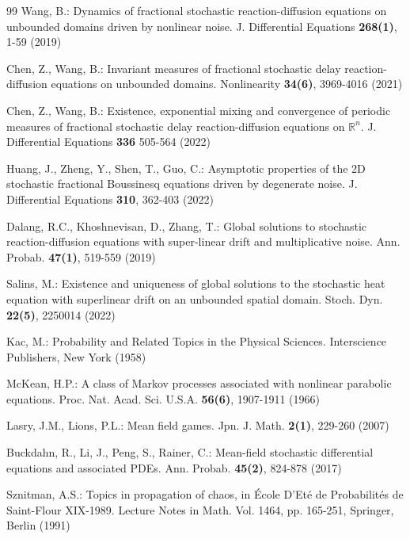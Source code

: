 \documentclass[11pt]{article}
\numberwithin{equation}{section}
\theoremstyle{plain}
\begin{document}
\begin{thebibliography}{99}
  Wang, B.:
  Dynamics of fractional stochastic reaction-diffusion equations on unbounded domains driven by nonlinear noise.
  J. Differential Equations  {\bf 268(1)}, 1-59 (2019)

  Chen, Z.,  Wang, B.:
  Invariant measures of fractional stochastic delay reaction-diffusion equations on unbounded domains.
  Nonlinearity  {\bf 34(6)}, 3969-4016 (2021)

  Chen, Z.,  Wang, B.:
  Existence, exponential mixing and convergence of periodic measures of fractional stochastic delay reaction-diffusion equations on $\mathbb{R}^n$.
  J. Differential Equations  {\bf 336} 505-564 (2022)

  Huang, J.,  Zheng, Y.,  Shen, T.,  Guo, C.:
  Asymptotic properties of the 2D stochastic fractional Boussinesq equations driven by degenerate noise.
  J. Differential Equations {\bf 310}, 362-403 (2022)

  Dalang, R.C.,  Khoshnevisan, D.,  Zhang, T.:
  Global solutions to stochastic reaction-diffusion equations with super-linear drift and multiplicative noise.
  Ann. Probab. {\bf 47(1)}, 519-559 (2019)

  Salins, M.:
  Existence and uniqueness of global solutions to the stochastic heat equation with superlinear drift on an unbounded spatial domain.
  Stoch. Dyn. {\bf 22(5)}, 2250014 (2022)




   Kac, M.:
   Probability and Related Topics in the Physical Sciences.
   Interscience Publishers, New York (1958)

   McKean, H.P.:
   A class of Markov processes associated with nonlinear parabolic equations.
   Proc. Nat. Acad. Sci. U.S.A. {\bf 56(6)}, 1907-1911 (1966)

   Lasry, J.M.,  Lions, P.L.:
   Mean field games.
   Jpn. J. Math. {\bf 2(1)}, 229-260 (2007)

  Buckdahn, R.,  Li, J.,  Peng, S.,  Rainer, C.:
  Mean-field stochastic differential equations and associated PDEs.
  Ann. Probab. {\bf 45(2)}, 824-878 (2017)




  Sznitman, A.S.:
  Topics in propagation of chaos,
  in \'{E}cole D'Et\'{e} de Probabilit\'{e}s de Saint-Flour XIX-1989.
  Lecture Notes in Math. Vol. 1464, pp. 165-251, Springer, Berlin (1991)


\end{thebibliography}
\end{document}
